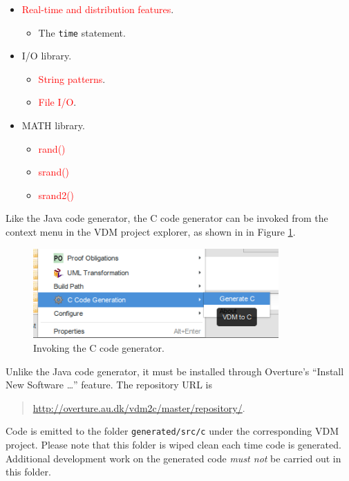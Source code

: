 \begin{itemize}
%
\item  \textcolor{red}{Real-time and distribution features}.
\begin{itemize}
\item  The \verb|time| statement.
\end{itemize}
%
\item  I/O library.
\begin{itemize}
\item  \textcolor{red}{String patterns}.
\item  \textcolor{red}{File I/O}.
\end{itemize}
%
\item MATH library.
\begin{itemize}
\item  \textcolor{red}{rand()}
\item  \textcolor{red}{srand()}
\item  \textcolor{red}{srand2()}
\end{itemize}
%
\end{itemize}

Like the Java code generator, the C code generator can be invoked from the context menu in the VDM project explorer, as shown in in Figure \ref{fig:invoking}.
%
%
%
\begin{figure}[ht]
\centering
\includegraphics[width=3.7in]{figures/InvokingCCG.png}
\caption{Invoking the C code generator.}
\label{fig:invoking}
\end{figure}
%
%
%
Unlike the Java code generator, it must be installed through Overture's ``Install New Software \dots'' feature.
%
The repository URL is
%
%
%
\begin{quote}
\url{http://overture.au.dk/vdm2c/master/repository/}.
\end{quote}
%
Code is emitted to the folder \texttt{generated/src/c} under the corresponding VDM project.
%
Please note that this folder is wiped clean each time code is generated.
%
Additional development work on the generated code \emph{must not} be carried out in this folder.

